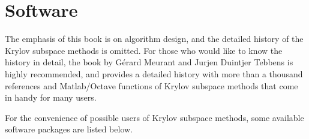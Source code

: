 \clearpage\section*{{Software}}
\makeatletter{}\label{chap:software}\makeatother

{The emphasis of this book is on algorithm design, and the detailed history of the Krylov subspace methods is omitted. For those who would like to know the history in detail, the book by Gérard Meurant and Jurjen Duintjer Tebbens  is highly recommended, and provides a detailed history with more than a thousand references and Matlab/Octave functions of Krylov subspace methods that come in handy for many users.}

{For the convenience of possible users of Krylov subspace methods, some available software packages are listed below.}

